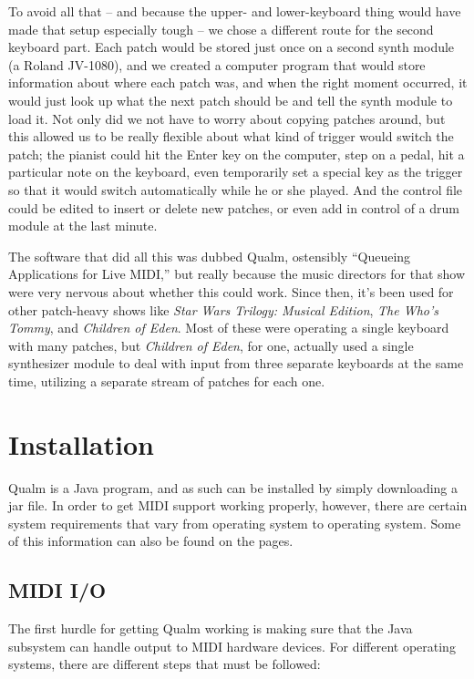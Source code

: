 \documentclass{article}
\newcommand{\q}{{\textsf{Qualm}}\xspace}
\begin{document}
To avoid all that -- and because the upper- and lower-keyboard thing
would have made that setup especially tough -- we chose a different
route for the second keyboard part.  Each patch would be stored just
once on a second synth module (a Roland JV-1080), and we created a
computer program that would store information about where each patch
was, and when the right moment occurred, it would just look up what
the next patch should be and tell the synth module to load it.  Not
only did we not have to worry about copying patches around, but this
allowed us to be really flexible about what kind of trigger would
switch the patch; the pianist could hit the Enter key on the computer,
step on a pedal, hit a particular note on the keyboard, even
temporarily set a special key as the trigger so that it would switch
automatically while he or she played.  And the control file could be
edited to insert or delete new patches, or even add in control of a
drum module at the last minute.

The software that did all this was dubbed \q, ostensibly ``Queueing
Applications for Live MIDI,'' but really because the music directors
for that show were very nervous about whether this could work.  Since
then, it's been used for other patch-heavy shows like {\em Star Wars
Trilogy: Musical Edition}, {\em The Who's Tommy}, and {\em Children of
Eden}.  Most of these were operating a single keyboard with many
patches, but {\em Children of Eden}, for one, actually used a single
synthesizer module to deal with input from three separate keyboards at
the same time, utilizing a separate stream of patches for each one.

\section{Installation}

\q is a Java program, and as such can be installed by simply
downloading a jar file.  In order to get MIDI support working
properly, however, there are certain system requirements that vary
from operating system to operating system.  Some of this information
can also be found on the  pages.

\subsection{MIDI I/O}

The first hurdle for getting \q working is making sure that the Java
subsystem can handle output to MIDI hardware devices.  For different
operating systems, there are different steps that must be followed:
\end{document}

